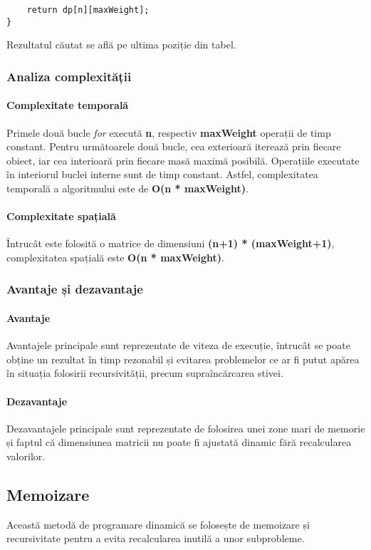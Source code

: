\documentclass[runningheads]{llncs}
\begin{document}
{\begin{lstlisting}
	return dp[n][maxWeight];
}
\end{lstlisting}

Rezultatul căutat se află pe ultima poziție din tabel.

\subsubsection{Analiza complexității}

\paragraph{Complexitate temporală} Primele două bucle \textit{for} execută \textbf{n},
respectiv \textbf{maxWeight} operații de timp constant. Pentru următoarele două bucle,
cea exterioară iterează prin fiecare obiect, iar cea interioară prin fiecare masă maximă
posibilă. Operațiile executate în interiorul buclei interne sunt de timp constant. Astfel,
complexitatea temporală a algoritmului este de \textbf{O(n * maxWeight)}.

\paragraph{Complexitate spațială} Întrucât este folosită o matrice de dimensiuni \textbf{(n+1) * (maxWeight+1)},
complexitatea spațială este \textbf{O(n * maxWeight)}.

\subsubsection{Avantaje și dezavantaje}

\paragraph{Avantaje} Avantajele principale sunt reprezentate de viteza de execuție, întrucât se poate
obține un rezultat în timp rezonabil și evitarea problemelor ce ar fi putut apărea în situația
folosirii recursivității, precum supraîncărcarea stivei.

\paragraph{Dezavantaje} Dezavantajele principale sunt reprezentate de folosirea unei zone mari de
memorie și faptul că dimensiunea matricii nu poate fi ajustată dinamic fără recalcularea valorilor.


\subsection{Memoizare}
Această metodă de programare dinamică se folosește de memoizare și recursivitate pentru
a evita recalcularea inutilă a unor subprobleme.

}
\end{document}
